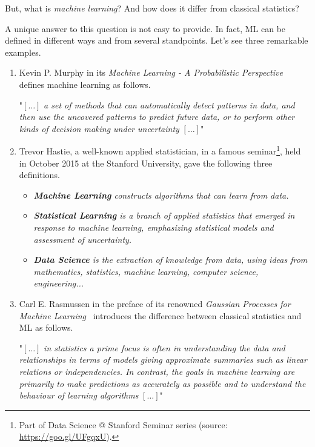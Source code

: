 But, what is \textit{machine learning}? And how does it differ from classical statistics?

A unique answer to this question is not easy to provide. In fact, ML can be defined in different ways and from several standpoints. Let's see three remarkable examples.

\begin{enumerate}
  \item Kevin P. Murphy in its \emph{Machine Learning - A Probabilistic Perspective}~\cite{murphy2012machine} defines machine learning as follows.

  \begin{displayquote}
  "$[\dots]$ \emph{a set of methods that can automatically detect patterns in data, and then use the uncovered patterns to predict future data, or to perform other kinds of decision making under uncertainty} $[\dots]$"
  \end{displayquote}

  \item Trevor Hastie, a well-known applied statistician, in a famous seminar\footnote{ Part of Data Science @ Stanford Seminar series (source: \url{https://goo.gl/UFgqxU}).}, held in October 2015 at the Stanford University, gave the following three definitions.

  \begin{displayquote}
    \begin{itemize}
      \item[] \emph{{\bf Machine Learning} constructs algorithms that can learn from data.}
      \item[] \emph{{\bf Statistical Learning}  is a branch of applied statistics that emerged in response to machine learning, emphasizing statistical models and assessment of uncertainty.}
      \item[] \emph{{\bf Data Science}  is the extraction of knowledge from data, using ideas from mathematics, statistics, machine learning, computer science, engineering...}
    \end{itemize}
  \end{displayquote}

  \item Carl E. Rasmussen in the preface of its renowned \emph{Gaussian Processes for Machine Learning}~\cite{rasmussen2006gaussian} introduces the difference between classical statistics and ML as follows.

  \begin{displayquote}
    "$[\dots]$ \emph{in statistics a prime focus is often in understanding the data and relationships in terms of models giving approximate summaries such as linear relations or independencies. In contrast, the goals in machine learning are primarily to make predictions as accurately as possible and to understand the behaviour of learning algorithms} $[\dots]$"
  \end{displayquote}

\end{enumerate}

